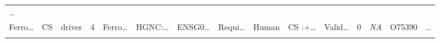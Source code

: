 \documentclass[
]{article}
\begin{document}
\begin{longtable}[]{@{}lllllllllllllll@{}}
\begin{minipage}[t]{0.02\columnwidth}
\ldots{}\strut
\end{minipage}\tabularnewline
\begin{minipage}[t]{0.05\columnwidth}\raggedright
Ferro\ldots{}\strut
\end{minipage} & \begin{minipage}[t]{0.04\columnwidth}\raggedright
CS\strut
\end{minipage} & \begin{minipage}[t]{0.04\columnwidth}\raggedright
driver\strut
\end{minipage} & \begin{minipage}[t]{0.02\columnwidth}\raggedright
4\strut
\end{minipage} & \begin{minipage}[t]{0.05\columnwidth}\raggedright
Ferro\ldots{}\strut
\end{minipage} & \begin{minipage}[t]{0.05\columnwidth}\raggedright
HGNC:\ldots{}\strut
\end{minipage} & \begin{minipage}[t]{0.05\columnwidth}\raggedright
ENSG0\ldots{}\strut
\end{minipage} & \begin{minipage}[t]{0.05\columnwidth}\raggedright
Requi\ldots{}\strut
\end{minipage} & \begin{minipage}[t]{0.04\columnwidth}\raggedright
Human\strut
\end{minipage} & \begin{minipage}[t]{0.05\columnwidth}\raggedright
CS :+\ldots{}\strut
\end{minipage} & \begin{minipage}[t]{0.05\columnwidth}\raggedright
Valid\ldots{}\strut
\end{minipage} & \begin{minipage}[t]{0.05\columnwidth}\raggedright
0\strut
\end{minipage} & \begin{minipage}[t]{0.05\columnwidth}\raggedright
\emph{NA}\strut
\end{minipage} & \begin{minipage}[t]{0.05\columnwidth}\raggedright
O75390\strut
\end{minipage} & \begin{minipage}[t]{0.02\columnwidth}\raggedright
\ldots{}\strut
\end{minipage}\tabularnewline
\begin{minipage}[t]{0.05\columnwidth}\raggedright

\end{minipage}
\end{longtable}
\end{document}
